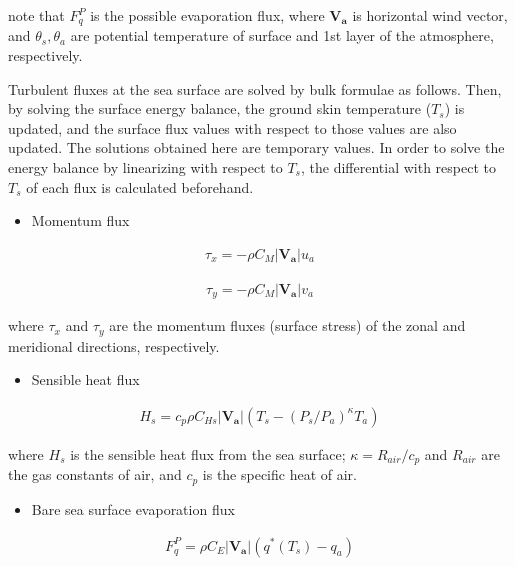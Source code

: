 note that \(F_q^P\) is the possible evaporation flux, where
\(\mathbf{V_a}\) is horizontal wind vector, and \(\theta_s, \theta_a\)
are potential temperature of surface and 1st layer of the atmosphere,
respectively.

Turbulent fluxes at the sea surface are solved by bulk formulae as
follows. Then, by solving the surface energy balance, the ground skin
temperature (\(T_s\)) is updated, and the surface flux values with
respect to those values are also updated. The solutions obtained here
are temporary values. In order to solve the energy balance by
linearizing with respect to \(T_s\), the differential with respect to
\(T_s\) of each flux is calculated beforehand.

\begin{itemize}
\tightlist
\item
  Momentum flux
\end{itemize}

\begin{eqnarray}
 \tau_x = - \rho C_{M}|\mathbf{V_a}| u_a
\end{eqnarray}

\begin{eqnarray}
 \tau_y = - \rho C_{M}|\mathbf{V_a}| v_a
\end{eqnarray}

where \(\tau_x\) and \(\tau_y\) are the momentum fluxes (surface stress)
of the zonal and meridional directions, respectively.

\begin{itemize}
\tightlist
\item
  Sensible heat flux
\end{itemize}

\begin{eqnarray}
 H_s = c_p \rho C_{Hs}|\mathbf{V_a}| (T_s - (P_s/P_a)^{\kappa}T_a)
\end{eqnarray}

where \(H_s\) is the sensible heat flux from the sea surface;
\(\kappa = R_{air} / c_p\) and \(R_{air}\) are the gas constants of air,
and \(c_p\) is the specific heat of air.

\begin{itemize}
\tightlist
\item
  Bare sea surface evaporation flux
\end{itemize}

\begin{eqnarray}
    F_q^P = \rho C_E |\mathbf{V_a}| \left( q^{\ast}(T_s) - q_a \right)
\end{eqnarray}

